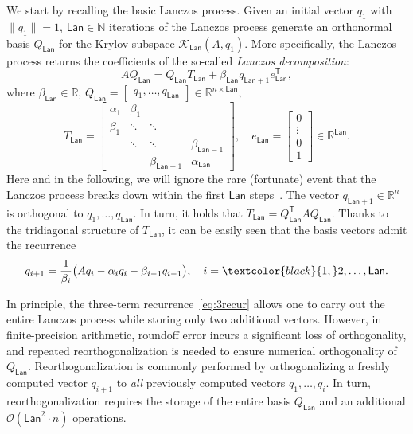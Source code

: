 \documentclass{siamart190516}
\newcommand{\Ttran}{\mathsf{T}}
\newcommand{\order}{\mathcal{O}}
\newcommand{\lan}{\mathsf{Lan}}
\newcommand{\R}{\mathbb{R}}
\providecommand{\edit}[1]{\textcolor{black}{#1}}
\begin{document}
We start by recalling the basic Lanczos process.
Given an initial vector $q_{1}$ with $\|q_1\| = 1$, $\lan \in \mathbb N$ iterations of the Lanczos process generate an orthonormal basis $Q_{\lan}$ for the Krylov subspace $\mathcal{K}_{\lan}(A,q_{1})$. More specifically, the Lanczos process returns the coefficients of the so-called \emph{Lanczos decomposition}:
\begin{equation}
    \label{eq:lanD}
    AQ_{\lan}
    = Q_{\lan}T_{\lan}+\beta_{\lan}q_{\lan+1}e_{\lan}^{\Ttran},
\end{equation}
where $\beta_{\lan} \in \R$, $Q_{\lan} = \begin{bmatrix}
        q_{1},\dotsc,q_{\lan}
    \end{bmatrix} \in \R^{n\times \lan}$, 
\begin{equation}
    \label{eq:lanD1}
    T_{\lan} = \begin{bmatrix}
        \alpha_{1} & \beta_{1} & &\\ 
        \beta_{1} & \ddots &\ddots&\\ 
        &\ddots &\ddots &\beta_{\lan-1}\\
        &&\beta_{\lan-1} &\alpha_{\lan} 
    \end{bmatrix}, \quad
    e_{\lan} = \begin{bmatrix}
    0 \\
    \vdots \\
    0 \\
    1
    \end{bmatrix} \in \R^{\lan}.
\end{equation}
Here and in the following, we will ignore the rare (fortunate) event that the Lanczos process breaks down within the first $\lan$ steps~\cite[Sec. 10.1.3]{Golub2013}. The vector $q_{\lan+1} \in \R^{n}$ is orthogonal to $q_{1},\dotsc,q_{\lan}$. In turn, it holds that $T_{\lan} = Q_{\lan}^{\Ttran}AQ_{\lan}$.
Thanks to the tridiagonal structure of $T_{\lan}$, it can be easily seen that the basis vectors admit the recurrence
\begin{equation}
    \label{eq:3recur}
    q_{i+1} = \frac{1}{\beta_{i}}\bigl(Aq_{i}-\alpha_{i}q_{i}-\beta_{i-1}q_{i-1}\bigr), \quad i = \edit{1,}2,\ldots,\lan.
\end{equation} 

In principle, the three-term recurrence~\eqref{eq:3recur} allows one to carry out the entire Lanczos process while storing only two additional vectors. However, in finite-precision arithmetic,  roundoff error incurs a significant loss of orthogonality, and repeated reorthogonalization is needed to ensure numerical orthogonality of $Q_{\lan}$. Reorthogonalization is commonly performed by orthogonalizing a freshly computed vector $q_{i+1}$ to \emph{all} previously computed vectors $q_1,\ldots,q_i$. In turn, reorthogonalization requires the storage of the entire basis $Q_{\lan}$ and an additional $\order(\lan^{2}\cdot n)$ operations.
\end{document}
